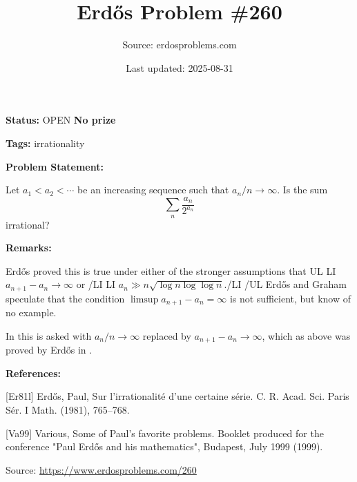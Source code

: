 \documentclass{article}
\title{Erd\H{o}s Problem \#260}
\date{Last updated: 2025-08-31}
\author{Source: erdosproblems.com}
\begin{document}
\maketitle

\noindent\textbf{Status:} OPEN \quad \textbf{No prize}

\noindent\textbf{Tags:} irrationality

\medskip
\noindent\textbf{Problem Statement:}

Let $a_1<a_2<\cdots$ be an increasing sequence such that $a_n/n\to \infty$. Is the sum\[\sum_n \frac{a_n}{2^{a_n}}\]irrational?

\bigskip
\noindent\textbf{Remarks:}

Erd\H{o}s \cite{Er81l} proved this is true under either of the stronger assumptions that
{UL}
{LI} $a_{n+1}-a_n\to \infty$ or {/LI}
{LI} $a_n \gg n\sqrt{\log n\log\log n}$.{/LI}
{/UL}
Erd\H{o}s and Graham speculate that the condition $\limsup a_{n+1}-a_n=\infty$ is not sufficient, but know of no example.

In \cite{Va99} this is asked with $a_n/n\to \infty$ replaced by $a_{n+1}-a_n\to \infty$, which as above was proved by Erd\H{o}s in \cite{Er81l}.

\bigskip
\noindent\textbf{References:}

[Er81l] Erd\H{o}s, Paul, Sur l'irrationalit\'{e}{} d'une certaine s\'{e}rie. C. R. Acad. Sci. Paris S\'{e}r. I Math. (1981), 765--768.
 
 [Va99] Various, Some of Paul's favorite problems. Booklet produced for the conference "Paul Erd\H{o}s and his mathematics", Budapest, July 1999 (1999).

\bigskip
\noindent\small{Source: \url{https://www.erdosproblems.com/260}}
\end{document}
